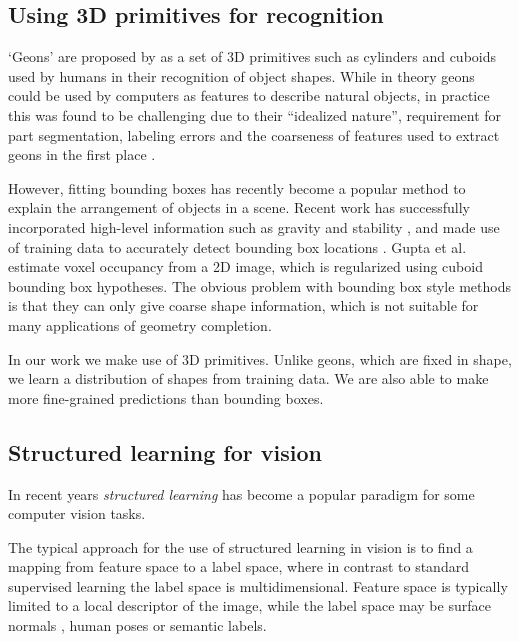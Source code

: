\documentclass[10pt,twocolumn,letterpaper]{article}
\makeatletter
\newcommand*{\ea}{et al.\@\xspace}
\makeatother
\begin{document}
\subsection{Using 3D primitives for recognition}

`Geons' are proposed by \cite{bieberman-rbc-1987} as a set of 3D primitives such as cylinders and cuboids used by humans in their recognition of object shapes.
While in theory geons could be used by computers  as features to describe natural objects, in practice this was found to be challenging due to their ``idealized nature'', requirement for part segmentation, labeling errors and the coarseness of features used to extract geons in the first place \cite{dickinson-iavc-1997}.

However, fitting bounding boxes has recently become a popular method to explain the arrangement of objects in a scene.
Recent work has successfully incorporated high-level information such as gravity and stability
 \cite{shao-siggraphasia-2014, jia-cvpr-2013}, and made use of training data to accurately detect bounding box locations \cite{hedau-cvpr-2012}.
Gupta \ea \cite{gupta-cvpr-2011} estimate voxel occupancy from a 2D image, which is regularized using cuboid bounding box hypotheses.
The obvious problem with bounding box style methods is that they can only give coarse shape information, which is not suitable for many applications of geometry completion.

In our work we make use of 3D primitives.
Unlike geons, which are fixed in shape, we learn a distribution of shapes from training data.
We are also able to make more fine-grained predictions than bounding boxes.

\subsection{Structured learning for vision}
In recent years \emph{structured learning} has become a popular paradigm for some computer vision tasks.

The typical approach for the use of structured learning in vision is to find a mapping from feature space to a label space, where in contrast to standard supervised learning the label space is multidimensional.
Feature space is typically limited to a local descriptor of the image, while the label space may be surface normals \cite{fouhey-iccv-2013}, human poses \cite{bourdev-iccv-2009} or semantic labels.
\end{document}
